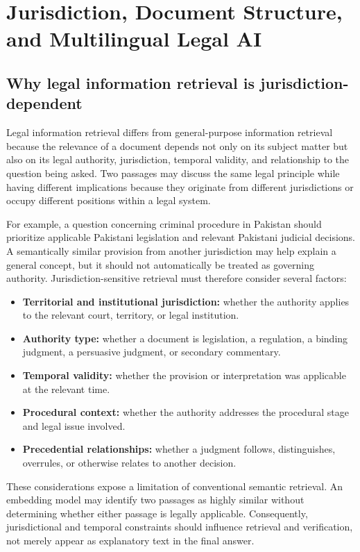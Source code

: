 \section{Jurisdiction, Document Structure, and Multilingual Legal AI}
\label{sec:jurisdiction}

\subsection{Why legal information retrieval is jurisdiction-dependent}

Legal information retrieval differs from general-purpose information retrieval because the relevance of a
document depends not only on its subject matter but also on its legal authority, jurisdiction, temporal
validity, and relationship to the question being asked. Two passages may discuss the same legal
principle while having different implications because they originate from different jurisdictions or
occupy different positions within a legal system.

For example, a question concerning criminal procedure in Pakistan should prioritize applicable Pakistani
legislation and relevant Pakistani judicial decisions. A semantically similar provision from another
jurisdiction may help explain a general concept, but it should not automatically be treated as governing
authority. Jurisdiction-sensitive retrieval must therefore consider several factors:
\begin{itemize}[leftmargin=1.4em, itemsep=2pt, topsep=2pt]
\item \textbf{Territorial and institutional jurisdiction:} whether the authority applies to the relevant
court, territory, or legal institution.
\item \textbf{Authority type:} whether a document is legislation, a regulation, a binding judgment, a
persuasive judgment, or secondary commentary.
\item \textbf{Temporal validity:} whether the provision or interpretation was applicable at the relevant
time.
\item \textbf{Procedural context:} whether the authority addresses the procedural stage and legal issue
involved.
\item \textbf{Precedential relationships:} whether a judgment follows, distinguishes, overrules, or
otherwise relates to another decision.
\end{itemize}

These considerations expose a limitation of conventional semantic retrieval. An embedding model may
identify two passages as highly similar without determining whether either passage is legally
applicable. Consequently, jurisdictional and temporal constraints should influence retrieval and
verification, not merely appear as explanatory text in the final answer.

